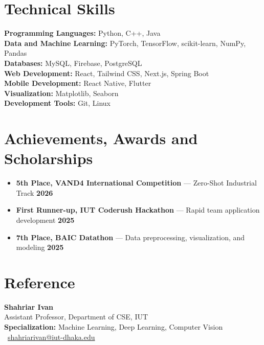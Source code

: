 \documentclass{resume}
\renewenvironment{rSection}[1]{
  \Needspace{3\baselineskip}%
  \section{#1}
  \begin{list}{}{
      \setlength{\leftmargin}{0.2em}
  }
  \item[]
}{
  \end{list}
  \vspace{0pt}
}
\begin{document}
\begin{rSection}{Technical Skills}
\textbf{Programming Languages:} Python, C++, Java \\
\textbf{Data and Machine Learning:} PyTorch, TensorFlow, scikit-learn, NumPy, Pandas \\
\textbf{Databases:} MySQL, Firebase, PostgreSQL \\
\textbf{Web Development:} React, Tailwind CSS, Next.js, Spring Boot \\
\textbf{Mobile Development:} React Native, Flutter \\
\textbf{Visualization:} Matplotlib, Seaborn \\
\textbf{Development Tools:} Git, Linux \\
\end{rSection}


\begin{rSection}{Achievements, Awards and Scholarships}
\begin{itemize}[leftmargin=*,label=$\bullet$]
  \item \textbf{5th Place, VAND4 International Competition} --- Zero-Shot Industrial Track \hfill \textbf{2026}
  \item \textbf{First Runner-up, IUT Coderush Hackathon} --- Rapid team application development \hfill \textbf{2025}
  \item \textbf{7th Place, BAIC Datathon} --- Data preprocessing, visualization, and modeling \hfill \textbf{2025}
\end{itemize}
\end{rSection}



\begin{rSection}{Reference}
\textbf{Shahriar Ivan} \\
Assistant Professor, Department of CSE, IUT \\
\textbf{Specialization:} Machine Learning, Deep Learning, Computer Vision \\
\faEnvelope\ \href{mailto:shahriarivan@iut-dhaka.edu}{shahriarivan@iut-dhaka.edu}
\end{rSection}
\end{document}
